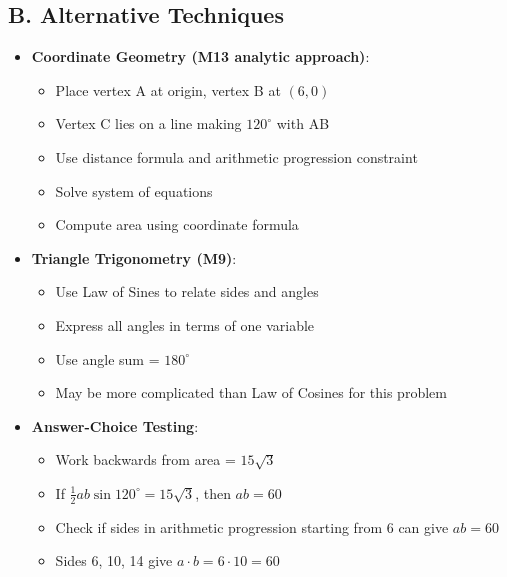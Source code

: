 \documentclass[12pt]{article}
\begin{document}
\begin{techniquesbox}
\subsection*{B. Alternative Techniques}
\begin{itemize}[leftmargin=*]
    \item \textbf{Coordinate Geometry (M13 analytic approach)}: 
    \begin{itemize}
        \item Place vertex A at origin, vertex B at $(6, 0)$
        \item Vertex C lies on a line making $120^\circ$ with AB
        \item Use distance formula and arithmetic progression constraint
        \item Solve system of equations
        \item Compute area using coordinate formula
    \end{itemize}
    \item \textbf{Triangle Trigonometry (M9)}:
    \begin{itemize}
        \item Use Law of Sines to relate sides and angles
        \item Express all angles in terms of one variable
        \item Use angle sum = $180^\circ$
        \item May be more complicated than Law of Cosines for this problem
    \end{itemize}
    \item \textbf{Answer-Choice Testing}:
    \begin{itemize}
        \item Work backwards from area = $15\sqrt{3}$
        \item If $\frac{1}{2}ab \sin 120^\circ = 15\sqrt{3}$, then $ab = 60$
        \item Check if sides in arithmetic progression starting from 6 can give $ab = 60$
        \item Sides 6, 10, 14 give $a \cdot b = 6 \cdot 10 = 60$ \checkmark
    \end{itemize}
\end{itemize}


\end{techniquesbox}
\end{document}
